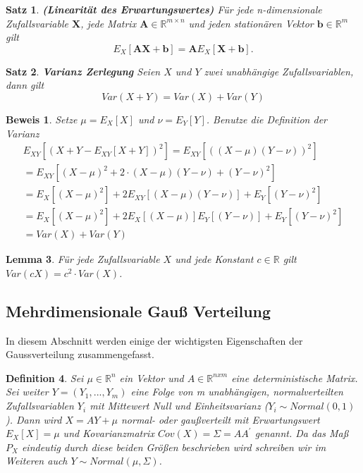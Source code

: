 \documentclass[12pt,a4paper]{scrartcl}
\newtheorem{Satz}{Satz}[section]
\newtheorem{Definition}[Satz]{Definition}
\newtheorem{Lemma}[Satz]{Lemma}
\newtheorem{Beweis}{Beweis}
\numberwithin{equation}{section}
\newcommand{\R}{\mathbb{R}} %
\begin{document}
 \begin{Satz}\textbf{(Linearität des Erwartungswertes)}
  Für jede n-dimensionale Zufallsvariable $\textbf{X}$, jede Matrix $\textbf{A} \in \R^{m \times n}$
  und jeden stationären Vektor $\textbf{b} \in \R^{m}$ gilt
  $$
  E_{X}[\textbf{AX} + \textbf{b}] = \textbf{A}E_{X}[\textbf{X} + \textbf{b}].
  $$
  \end{Satz}
  
  \begin{Satz}\textbf{Varianz Zerlegung}
   Seien $X$ und $Y$ zwei unabhängige Zufallsvariablen, dann gilt 
   $$
   Var(X + Y) = Var(X) + Var(Y)
   $$
  \end{Satz}
  \begin{Beweis}
   Setze $\mu = E_{X}[X]$ und $\nu = E_{Y}[Y]$. Benutze die Definition der Varianz
   $$
   \begin{array}{c}
     E_{XY}[(X+Y-E_{XY}[X+Y])^{2}] = E_{XY}[((X-\mu)(Y-\nu))^{2}] \\
     = E_{XY}[(X-\mu)^{2}+ 2 \cdot (X-\mu)(Y-\nu) + (Y-\nu)^{2}]  \\
     = E_{X}[(X-\mu)^{2}] + 2E_{XY}[(X-\mu)(Y-\nu)] + E_{Y}[(Y-\nu)^{2}] \\
     = E_{X}[(X-\mu)^{2}] + 2E_{X}[(X-\mu)]E_{Y}[(Y-\nu)] + E_{Y}[(Y-\nu)^{2}] \\
     = Var(X) + Var(Y)
   \end{array}
   $$
  \end{Beweis}

  \begin{Lemma}
   Für jede Zufallsvariable $X$ und jede Konstant $c \in \R$ gilt \\ 
   $Var(cX) = c^{2} \cdot Var(X)$.
  \end{Lemma}

\subsection{Mehrdimensionale Gauß Verteilung}

In diesem Abschnitt werden einige der wichtigsten Eigenschaften der Gaussverteilung zusammengefasst.

\begin{Definition} Sei $\mu \in \R^n$ ein Vektor und $A \in \R^{nxm}$ eine deterministische Matrix. 
Sei weiter $ Y = (Y_{1},...,Y_{m})$ eine Folge von m unabhängigen, normalverteilten Zufallsvariablen
$Y_{i}$ mit Mittewert Null und Einheitsvarianz ($Y_{i} \sim Normal(0,1)$). Dann wird $X = AY + \mu$ normal-
oder gaußverteilt mit Erwartungswert $E_{X}[X] = \mu$ und Kovarianzmatrix $Cov(X) = \varSigma = AA^{'}$ genannt.
Da das Maß $P_{X}$ eindeutig durch diese beiden Größen beschrieben wird schreiben wir im Weiteren auch $Y \sim Normal(\mu , \varSigma)$.
\end{Definition}
\end{document}
